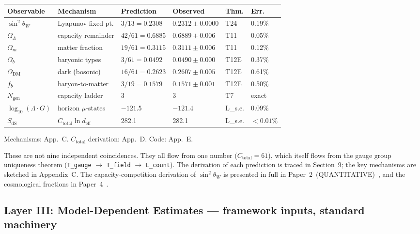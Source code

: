 \documentclass[11pt]{article}
\begin{document}
\smallskip
\begin{center}
\small
\begin{tabular}{p{2cm}p{3.2cm}p{2.5cm}p{2.5cm}p{0.8cm}p{1cm}}
\toprule
\textbf{Observable} & \textbf{Mechanism} & \textbf{Prediction} & \textbf{Observed} & \textbf{Thm.} & \textbf{Err.} \\
\midrule
$\sin^2\!\theta_W$ & Lyapunov fixed pt. & $3/13 = 0.2308$ & $0.2312 \pm 0.0000$ & T24 & 0.19\% \\
$\Omega_\Lambda$ & capacity remainder & $42/61 = 0.6885$ & $0.6889 \pm 0.006$ & T11 & 0.05\% \\
$\Omega_m$ & matter fraction & $19/61 = 0.3115$ & $0.3111 \pm 0.006$ & T11 & 0.12\% \\
$\Omega_b$ & baryonic types & $3/61 = 0.0492$ & $0.0490 \pm 0.000$ & T12E & 0.37\% \\
$\Omega_{\mathrm{DM}}$ & dark (bosonic) & $16/61 = 0.2623$ & $0.2607 \pm 0.005$ & T12E & 0.61\% \\
$f_b$ & baryon-to-matter & $3/19 = 0.1579$ & $0.1571 \pm 0.001$ & T12E & 0.50\% \\
$N_{\mathrm{gen}}$ & capacity ladder & 3 & 3 & T7 & exact \\
$\log_{10}(\Lambda\!\cdot\! G)$ & horizon $\mu$-states & $-121.5$ & $-121.4$ & L\_s.e. & 0.09\% \\
$S_{\mathrm{dS}}$ & $C_{\mathrm{total}}\ln d_{\mathrm{eff}}$ & 282.1 & 282.1 & L\_s.e. & ${<}0.01$\% \\
\bottomrule
\end{tabular}
\end{center}
\smallskip

\noindent Mechanisms: App.~C.  $C_{\mathrm{total}}$ derivation: App.~D.  Code: App.~E.

These are not nine independent coincidences.  They all flow from one number ($C_{\mathrm{total}} = 61$), which itself flows from the gauge group uniqueness theorem (\texttt{T\_gauge} $\to$ \texttt{T\_field} $\to$ \texttt{L\_count}).  The derivation of each prediction is traced in Section~9; the key mechanisms are sketched in Appendix~C.  The capacity-competition derivation of $\sin^2\!\theta_W$ is presented in full in Paper~2~(QUANTITATIVE)~\cite{P2Q}, and the cosmological fractions in Paper~4~\cite{P4}.


\subsection{Layer III: Model-Dependent Estimates --- framework inputs, standard machinery}
\end{document}

